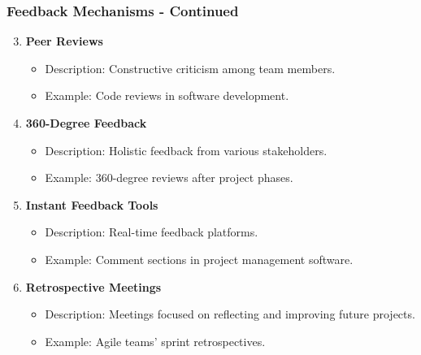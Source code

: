 \documentclass[aspectratio=169]{beamer}
\begin{document}
\begin{frame}[fragile]
    \frametitle{Feedback Mechanisms - Continued}
    \begin{enumerate}
        \setcounter{enumi}{2} %
        \item \textbf{Peer Reviews}
            \begin{itemize}
                \item Description: Constructive criticism among team members.
                \item Example: Code reviews in software development.
            \end{itemize}
        \item \textbf{360-Degree Feedback}
            \begin{itemize}
                \item Description: Holistic feedback from various stakeholders.
                \item Example: 360-degree reviews after project phases.
            \end{itemize}
        \item \textbf{Instant Feedback Tools}
            \begin{itemize}
                \item Description: Real-time feedback platforms.
                \item Example: Comment sections in project management software.
            \end{itemize}
        \item \textbf{Retrospective Meetings}
            \begin{itemize}
                \item Description: Meetings focused on reflecting and improving future projects.
                \item Example: Agile teams' sprint retrospectives.
            \end{itemize}
    \end{enumerate}
\end{frame}
\end{document}
